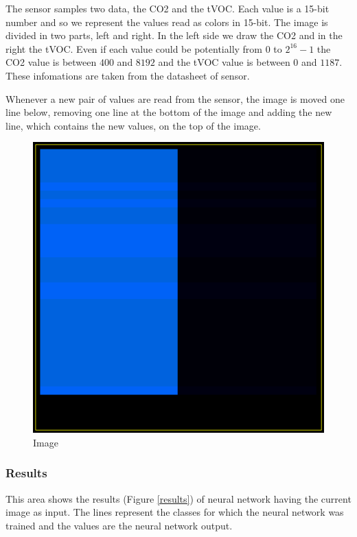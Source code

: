 \documentclass[12pt]{article}
\begin{document}
The sensor samples two data, the CO2 and the tVOC. Each value is a 15-bit
number and so we represent the values read as colors in 15-bit. The image is
divided in two parts, left and right. In the left side we draw the CO2 and in
the right the tVOC. Even if each value could be potentially from $0$ to
$2^{16} - 1$ the CO2 value is between $400$ and $8192$ and the tVOC value is
between $0$ and $1187$. These infomations are taken from the datasheet of
sensor.

Whenever a new pair of values are read from the sensor, the image is moved
one line below, removing one line at the bottom of the image and adding the
new line, which contains the new values, on the top of the image.

\begin{figure}[H]
    \centering
    \includegraphics[scale=0.60]{images/image.png}
    \caption{Image}
    \label{image}
\end{figure}

\subsubsection*{Results}
This area shows the results (Figure \ref{results}) of neural network having
the current image as input. The lines represent the classes for which the
neural network was trained and the values are the neural network output.
\end{document}
